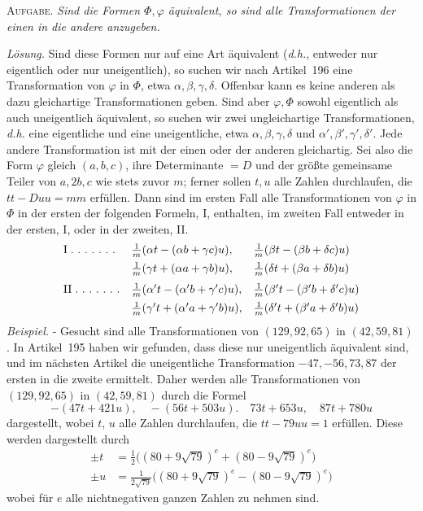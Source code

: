 \textsc{Aufgabe.} \textit{Sind die Formen \(\Phi,\varphi\) äquivalent, so sind alle Transformationen der einen in die andere anzugeben.}

\textit{Lösung.} Sind diese Formen nur auf eine Art äquivalent (\textit{d.h.}, entweder nur eigentlich oder nur uneigentlich), so suchen wir nach Artikel~196 eine Transformation von \(\varphi\) in \(\Phi\), etwa \(\alpha,\beta,\gamma,\delta\). Offenbar kann es keine anderen als dazu gleichartige Transformationen geben. Sind aber \(\varphi,\Phi\) sowohl eigentlich als auch uneigentlich äquivalent, so suchen wir zwei ungleichartige Transformationen, \textit{d.h.} eine eigentliche und eine uneigentliche, etwa \(\alpha,\beta,\gamma,\delta\) und \(\alpha',\beta',\gamma',\delta'\). Jede andere Transformation ist mit der einen oder der anderen gleichartig. Sei also die Form \(\varphi\) gleich \((a,b,c)\), ihre Determinante \(=D\) und der größte gemeinsame Teiler von \(a,2b,c\) wie stets zuvor \(m\); ferner sollen \(t,u\) alle Zahlen durchlaufen, die \(tt-Duu=mm\) erfüllen. Dann sind im ersten Fall alle Transformationen von \(\varphi\) in \(\Phi\) in der ersten der folgenden Formeln, I, enthalten, im zweiten Fall entweder in der ersten, I, oder in der zweiten, II.
\[
\begin{array}{@{}lll@{}}
\mathrm{I}\;\ldotp\,\ldotp\,\ldotp\,\ldotp\,\ldotp\,\ldotp\,\ldotp&\frac1m(\alpha t-(\alpha b+\gamma c)u),&\frac1m(\beta t-(\beta b+\delta c)u)\\[1ex]
&\frac1m(\gamma t+(\alpha a+\gamma b)u),&\frac1m(\delta t+(\beta a+\delta b)u)\\[1.5ex]
\mathrm{II}\;\ldotp\,\ldotp\,\ldotp\,\ldotp\,\ldotp\,\ldotp\,\ldotp&\frac1m(\alpha't-(\alpha'b+\gamma'c)u),&\frac1m(\beta't-(\beta'b+\delta'c)u)\\[1ex]
&\frac1m(\gamma't+(\alpha'a+\gamma'b)u),&\frac1m(\delta't+(\beta'a+\delta'b)u)
\end{array}
\]
\textit{Beispiel.} - Gesucht sind alle Transformationen von $(129,92,65)$ in $(42,59,81)$. In Artikel~195 haben wir gefunden, dass diese nur uneigentlich äquivalent sind, und im nächsten Artikel die uneigentliche Transformation $-47,-56,73,87$ der ersten in die zweite ermittelt. Daher werden alle Transformationen von $(129,92,65)$ in $(42,59,81)$ durch die Formel
\[
-(47t+421u),\quad -(56t+503u).\quad 73t+653u,\quad 87t+780u
\]
dargestellt, wobei $t$, $u$ alle Zahlen durchlaufen, die $tt-79uu=1$ erfüllen. Diese werden dargestellt durch
\[
\begin{aligned}
\pm t&=\tfrac12\bigl((80+9\sqrt{79})^e+(80-9\sqrt{79})^e\bigr)\\
\pm u&=\tfrac{1}{2\sqrt{79}}\bigl((80+9\sqrt{79})^e-(80-9\sqrt{79})^e\bigr)
\end{aligned}
\]
wobei für $e$ alle nichtnegativen ganzen Zahlen zu nehmen sind.

